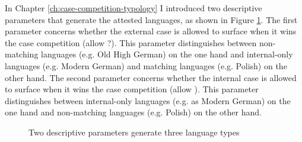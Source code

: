 In Chapter \ref{ch:case-competition-typology} I introduced two descriptive parameters that generate the attested languages, as shown in Figure \ref{fig:two-parameters}.
The first parameter concerns whether the external case is allowed to surface when it wins the case competition (allow ?). This parameter distinguishes between non-matching languages (e.g. Old High German) on the one hand and internal-only languages (e.g. Modern German) and matching languages (e.g. Polish) on the other hand.
The second parameter concerns whether the internal case is allowed to surface when it wins the case competition (allow ). This parameter distinguishes between internal-only languages (e.g. as Modern German) on the one hand and non-matching languages (e.g. Polish) on the other hand.

\begin{figure}[H]
  \centering
    \footnotesize{
    }
    \caption{Two descriptive parameters generate three language types}
    \label{fig:two-parameters}
\end{figure}

